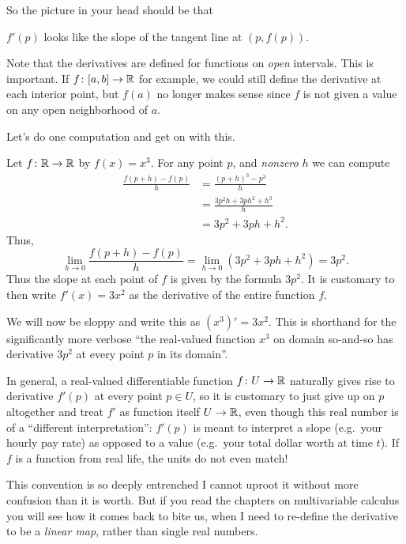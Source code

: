So the picture in your head should be that
\begin{moral}
	$f'(p)$ looks like the slope of the tangent line at $(p, f(p))$.
\end{moral}

\begin{remark}
	Note that the derivatives are defined
	for functions on \emph{open} intervals.
	This is important.
	If $f \colon [a,b] \to \mathbb R$ for example,
	we could still define the derivative at each interior point,
	but $f(a)$ no longer makes sense
	since $f$ is not given a value on any open neighborhood of $a$.
\end{remark}

Let's do one computation and get on with this.
\begin{example}
	[Derivative of $x^3$ is $3x^2$]
	Let $f \colon \mathbb R \to \mathbb R$ by $f(x) = x^3$.
	For any point $p$, and \emph{nonzero} $h$ we can compute
	\begin{align*}
		\frac{f(p+h) - f(p)}{h} &= \frac{(p+h)^3 - p^3}{h} \\
		&= \frac{3p^2h + 3ph^2 + h^3}{h} \\
		&= 3p^2 + 3ph + h^2.
	\end{align*}
	Thus,
	\[ \lim_{h \to 0} \frac{f(p+h)-f(p)}{h}
		= \lim_{h \to 0} (3p^2+3ph+h^2) = 3p^2. \]
	Thus the slope at each point of $f$ is given by the formula $3p^2$.
	It is customary to then write $f'(x) = 3x^2$
	as the derivative of the entire function $f$.
\end{example}
\begin{abuse}
	We will now be sloppy and write this as $(x^3)' = 3x^2$.
	This is shorthand for the significantly more verbose
	``the real-valued function $x^3$ on domain so-and-so
	has derivative $3p^2$ at every point $p$ in its domain''.

	In general, a real-valued differentiable function
	$f \colon U \to \mathbb R$ naturally gives rise to derivative
	$f'(p)$ at every point $p \in U$,
	so it is customary to just give up on $p$ altogether
	and treat $f'$ as function itself $U \to \mathbb R$,
	even though this real number is of a ``different interpretation'':
	$f'(p)$ is meant to interpret a slope (e.g.\ your hourly pay rate)
	as opposed to a value (e.g.\ your total dollar worth at time $t$).
	If $f$ is a function from real life, the units do not even match!

	This convention is so deeply entrenched I cannot uproot it
	without more confusion than it is worth.
	But if you read the chapters on multivariable calculus
	you will see how it comes back to bite us,
	when I need to re-define the derivative to be a \emph{linear map},
	rather than single real numbers.
\end{abuse}

